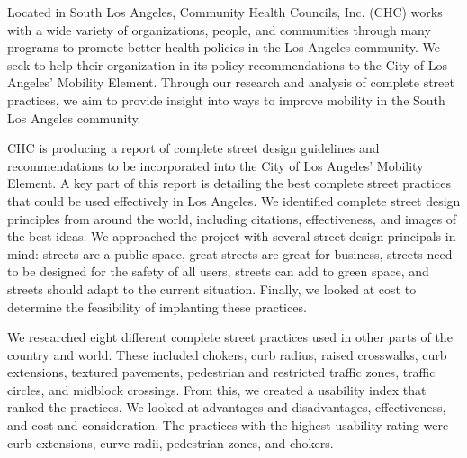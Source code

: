 Located in South Los Angeles, Community Health Councils, Inc. (CHC) works with a wide variety of organizations, people, and communities through many programs to promote better health policies in the Los Angeles community.  We seek to help their organization in its policy recommendations to the City of Los Angeles’ Mobility Element.  Through our research and analysis of complete street practices, we aim to provide insight into ways to improve mobility in the South Los Angeles community.

CHC is producing a report of complete street design guidelines and recommendations to be incorporated into the City of Los Angeles’ Mobility Element.  A key part of this report is detailing the best complete street practices that could be used effectively in Los Angeles.  We identified complete street design principles from around the world, including citations, effectiveness, and images of the best ideas.  We approached the project with several street design principals in mind:  streets are a public space, great streets are great for business, streets need to be designed for the safety of all users, streets can add to green space, and streets should adapt to the current situation.  Finally, we looked at cost to determine the feasibility of implanting these practices.  

	We researched eight different complete street practices used in other parts of the country and world.  These included chokers, curb radius, raised crosswalks, curb extensions, textured pavements, pedestrian and restricted traffic zones, traffic circles, and midblock crossings.  From this, we created a usability index that ranked the practices.  We looked at advantages and disadvantages, effectiveness, and cost and consideration.  The practices with the highest usability rating were curb extensions, curve radii, pedestrian zones, and chokers.  
